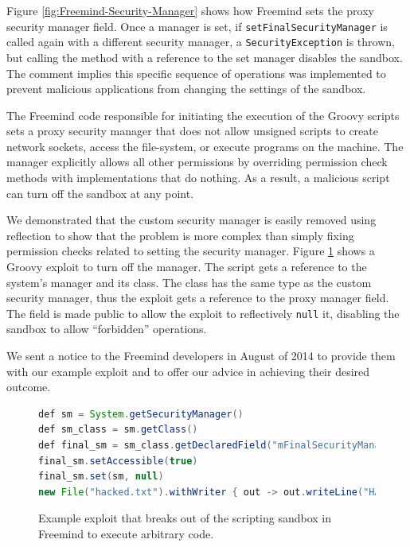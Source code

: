 \documentclass{sig-alternate}
\begin{document}
Figure \ref{fig:Freemind-Security-Manager} shows how Freemind sets
the proxy security manager field.
Once a manager is set, if \texttt{setFinalSecurityManager} is called
again with a different security manager, a \texttt{SecurityException}
is thrown, but calling the method with a reference to the set manager disables the sandbox. The comment implies this specific sequence
of operations was implemented to prevent malicious applications from
changing the settings of the sandbox.

The Freemind code responsible for initiating the execution of the
Groovy scripts sets a proxy security manager that does not allow unsigned
scripts to create network sockets, access the file-system, or execute
programs on the machine. The manager explicitly allows all other permissions by overriding permission check methods with implementations that do nothing. As a result, a malicious script can turn off the sandbox at any point.

We demonstrated that the custom security manager is easily removed
using reflection to show that the problem is more complex than simply
fixing permission checks related to setting the security manager. Figure \ref{fig:Example-Exploit-for-Freemind}
shows a Groovy exploit to turn off the manager. The script gets a reference to the system's manager
and its class. The class has the same type as the custom security
manager, thus the exploit gets a reference to the proxy manager field.
The field is made public to allow the exploit to reflectively \texttt{null}
it, disabling the sandbox to allow ``forbidden'' operations.

We sent a notice to the Freemind developers in August of 2014 to provide
them with our example exploit and to offer our advice in achieving
their desired outcome. 

\begin{figure}
\begin{lstlisting}[language=Java,basicstyle={\scriptsize},breaklines=true]
def sm = System.getSecurityManager() 
def sm_class = sm.getClass() 
def final_sm = sm_class.getDeclaredField("mFinalSecurityManager")
final_sm.setAccessible(true) 
final_sm.set(sm, null)
new File("hacked.txt").withWriter { out -> out.writeLine("HACKED!") }
\end{lstlisting}


\caption{Example exploit that breaks out of the scripting sandbox in Freemind
to execute arbitrary code.}
\label{fig:Example-Exploit-for-Freemind}
\end{figure}
\end{document}
